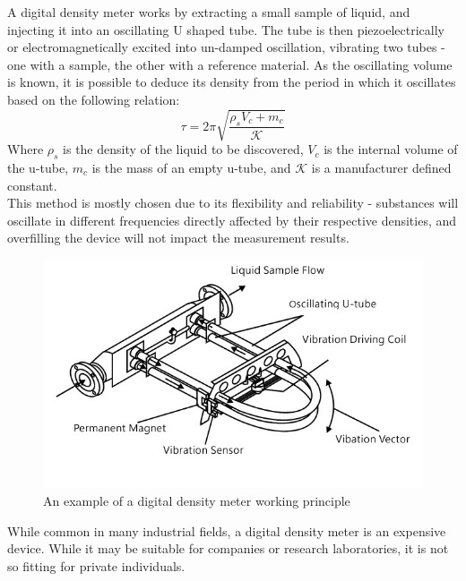 \documentclass[twoside]{ctuthesis}
\theoremstyle{plain}
\theoremstyle{definition}
\theoremstyle{note}
\begin{document}
A digital density meter works by extracting a small sample of liquid, and injecting it into an oscillating U shaped tube. The tube is then piezoelectrically or electromagnetically excited into un-damped oscillation, vibrating two tubes - one with a sample, the other with a reference material. As the oscillating volume is known, it is possible to deduce its density from the period in which it oscillates based on the following relation:
\begin{equation}
	\tau = 2\pi \sqrt{\frac{\rho_sV_c+m_c}{\mathcal{K}}}
\end{equation}
Where $\rho_s$ is the density of the liquid to be discovered, $V_c$ is the internal volume of the u-tube, $m_c$ is the mass of an empty u-tube, and $\mathcal{K}$ is a manufacturer defined constant.\\

This method is mostly chosen due to its flexibility and reliability - substances will oscillate in different frequencies directly affected by their respective densities, and overfilling the device will not impact the measurement results\cite{Density_Measurement}.
\begin{figure}[H]
	\centering
	\includegraphics[scale = 0.45]{u-tube-density-meter}
	\caption{An example of a digital density meter working principle}
\end{figure}

While common in many industrial fields, a digital density meter is an expensive device. While it may be suitable for companies or research laboratories, it is not so fitting for private individuals.
\end{document}

